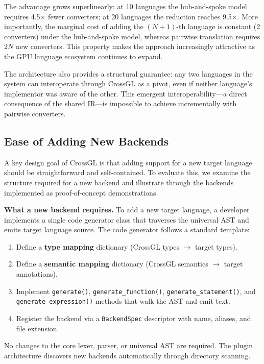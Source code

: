 \documentclass{svproc}
\begin{document}
The advantage grows superlinearly: at 10 languages the hub-and-spoke model requires 4.5$\times$ fewer converters; at 20 languages the reduction reaches 9.5$\times$. More importantly, the marginal cost of adding the $(N+1)$-th language is constant (2 converters) under the hub-and-spoke model, whereas pairwise translation requires $2N$ new converters. This property makes the approach increasingly attractive as the GPU language ecosystem continues to expand.

The architecture also provides a structural guarantee: any two languages in the system can interoperate through CrossGL as a pivot, even if neither language's implementor was aware of the other. This emergent interoperability---a direct consequence of the shared IR---is impossible to achieve incrementally with pairwise converters.

\subsection{Ease of Adding New Backends}

A key design goal of CrossGL is that adding support for a new target language should be straightforward and self-contained. To evaluate this, we examine the structure required for a new backend and illustrate through the backends implemented as proof-of-concept demonstrations.

\textbf{What a new backend requires.} To add a new target language, a developer implements a single code generator class that traverses the universal AST and emits target language source. The code generator follows a standard template:

\begin{enumerate}
\item Define a \textbf{type mapping} dictionary (CrossGL types $\rightarrow$ target types).
\item Define a \textbf{semantic mapping} dictionary (CrossGL semantics $\rightarrow$ target annotations).
\item Implement \texttt{generate()}, \texttt{generate\_function()}, \texttt{generate\_statement()}, and \texttt{generate\_expression()} methods that walk the AST and emit text.
\item Register the backend via a \texttt{BackendSpec} descriptor with name, aliases, and file extension.
\end{enumerate}

No changes to the core lexer, parser, or universal AST are required. The plugin architecture discovers new backends automatically through directory scanning.
\end{document}
